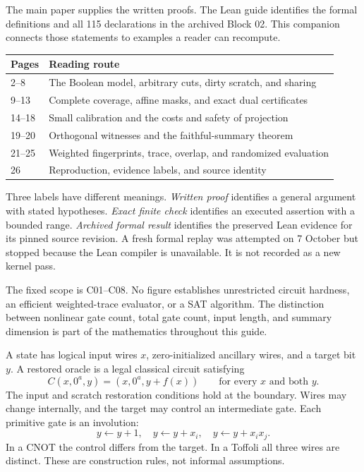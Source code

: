 The main paper supplies the written proofs. The Lean guide identifies the
formal definitions and all 115 declarations in the archived Block 02. This
companion connects those statements to examples a reader can recompute.

\begin{tabularx}{\textwidth}{@{}p{1.65in}X@{}}\toprule
Pages & Reading route\\\midrule
2--8 & The Boolean model, arbitrary cuts, dirty scratch, and sharing\\
9--13 & Complete coverage, affine masks, and exact dual certificates\\
14--18 & Small calibration and the costs and safety of projection\\
19--20 & Orthogonal witnesses and the faithful-summary theorem\\
21--25 & Weighted fingerprints, trace, overlap, and randomized evaluation\\
26 & Reproduction, evidence labels, and source identity\\\bottomrule
\end{tabularx}

Three labels have different meanings. \emph{Written proof} identifies a
general argument with stated hypotheses. \emph{Exact finite check} identifies
an executed assertion with a bounded range. \emph{Archived formal result}
identifies the preserved Lean evidence for its pinned source revision. A
fresh formal replay was attempted on 7 October but stopped because the Lean
compiler is unavailable. It is not recorded as a new kernel pass.

The fixed scope is C01--C08. No figure establishes unrestricted circuit
hardness, an efficient weighted-trace evaluator, or a SAT algorithm. The
distinction between nonlinear gate count, total gate count, input length,
and summary dimension is part of the mathematics throughout this guide.


A state has logical input wires $x$, zero-initialized ancillary wires, and a
target bit $y$. A restored oracle is a legal classical circuit satisfying
\[
 C(x,0^a,y)=(x,0^a,y+f(x))
 \qquad\text{for every }x\text{ and both }y.
\]
The input and scratch restoration conditions hold at the boundary. Wires may
change internally, and the target may control an intermediate gate. Each
primitive gate is an involution:
\[
 y\leftarrow y+1,\quad y\leftarrow y+x_i,\quad
 y\leftarrow y+x_i x_j.
\]
In a CNOT the control differs from the target. In a Toffoli all three wires
are distinct. These are construction rules, not informal assumptions.

